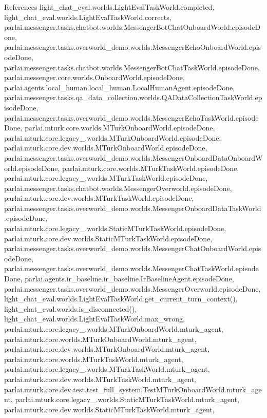 References light\+\_\+chat\+\_\+eval.\+worlds.\+Light\+Eval\+Task\+World.\+completed, light\+\_\+chat\+\_\+eval.\+worlds.\+Light\+Eval\+Task\+World.\+corrects, parlai.\+messenger.\+tasks.\+chatbot.\+worlds.\+Messenger\+Bot\+Chat\+Onboard\+World.\+episode\+Done, parlai.\+messenger.\+tasks.\+overworld\+\_\+demo.\+worlds.\+Messenger\+Echo\+Onboard\+World.\+episode\+Done, parlai.\+messenger.\+tasks.\+chatbot.\+worlds.\+Messenger\+Bot\+Chat\+Task\+World.\+episode\+Done, parlai.\+messenger.\+core.\+worlds.\+Onboard\+World.\+episode\+Done, parlai.\+agents.\+local\+\_\+human.\+local\+\_\+human.\+Local\+Human\+Agent.\+episode\+Done, parlai.\+messenger.\+tasks.\+qa\+\_\+data\+\_\+collection.\+worlds.\+Q\+A\+Data\+Collection\+Task\+World.\+episode\+Done, parlai.\+messenger.\+tasks.\+overworld\+\_\+demo.\+worlds.\+Messenger\+Echo\+Task\+World.\+episode\+Done, parlai.\+mturk.\+core.\+worlds.\+M\+Turk\+Onboard\+World.\+episode\+Done, parlai.\+mturk.\+core.\+legacy\+\_.\+worlds.\+M\+Turk\+Onboard\+World.\+episode\+Done, parlai.\+mturk.\+core.\+dev.\+worlds.\+M\+Turk\+Onboard\+World.\+episode\+Done, parlai.\+messenger.\+tasks.\+overworld\+\_\+demo.\+worlds.\+Messenger\+Onboard\+Data\+Onboard\+World.\+episode\+Done, parlai.\+mturk.\+core.\+worlds.\+M\+Turk\+Task\+World.\+episode\+Done, parlai.\+mturk.\+core.\+legacy\+\_.\+worlds.\+M\+Turk\+Task\+World.\+episode\+Done, parlai.\+messenger.\+tasks.\+chatbot.\+worlds.\+Messenger\+Overworld.\+episode\+Done, parlai.\+mturk.\+core.\+dev.\+worlds.\+M\+Turk\+Task\+World.\+episode\+Done, parlai.\+messenger.\+tasks.\+overworld\+\_\+demo.\+worlds.\+Messenger\+Onboard\+Data\+Task\+World.\+episode\+Done, parlai.\+mturk.\+core.\+legacy\+\_.\+worlds.\+Static\+M\+Turk\+Task\+World.\+episode\+Done, parlai.\+mturk.\+core.\+dev.\+worlds.\+Static\+M\+Turk\+Task\+World.\+episode\+Done, parlai.\+messenger.\+tasks.\+overworld\+\_\+demo.\+worlds.\+Messenger\+Chat\+Onboard\+World.\+episode\+Done, parlai.\+messenger.\+tasks.\+overworld\+\_\+demo.\+worlds.\+Messenger\+Chat\+Task\+World.\+episode\+Done, parlai.\+agents.\+ir\+\_\+baseline.\+ir\+\_\+baseline.\+Ir\+Baseline\+Agent.\+episode\+Done, parlai.\+messenger.\+tasks.\+overworld\+\_\+demo.\+worlds.\+Messenger\+Overworld.\+episode\+Done, light\+\_\+chat\+\_\+eval.\+worlds.\+Light\+Eval\+Task\+World.\+get\+\_\+current\+\_\+turn\+\_\+context(), light\+\_\+chat\+\_\+eval.\+worlds.\+is\+\_\+disconnected(), light\+\_\+chat\+\_\+eval.\+worlds.\+Light\+Eval\+Task\+World.\+max\+\_\+wrong, parlai.\+mturk.\+core.\+legacy\+\_.\+worlds.\+M\+Turk\+Onboard\+World.\+mturk\+\_\+agent, parlai.\+mturk.\+core.\+worlds.\+M\+Turk\+Onboard\+World.\+mturk\+\_\+agent, parlai.\+mturk.\+core.\+dev.\+worlds.\+M\+Turk\+Onboard\+World.\+mturk\+\_\+agent, parlai.\+mturk.\+core.\+worlds.\+M\+Turk\+Task\+World.\+mturk\+\_\+agent, parlai.\+mturk.\+core.\+legacy\+\_.\+worlds.\+M\+Turk\+Task\+World.\+mturk\+\_\+agent, parlai.\+mturk.\+core.\+dev.\+worlds.\+M\+Turk\+Task\+World.\+mturk\+\_\+agent, parlai.\+mturk.\+core.\+dev.\+test.\+test\+\_\+full\+\_\+system.\+Test\+M\+Turk\+Onboard\+World.\+mturk\+\_\+agent, parlai.\+mturk.\+core.\+legacy\+\_.\+worlds.\+Static\+M\+Turk\+Task\+World.\+mturk\+\_\+agent, parlai.\+mturk.\+core.\+dev.\+worlds.\+Static\+M\+Turk\+Task\+World.\+mturk\+\_\+agent, 